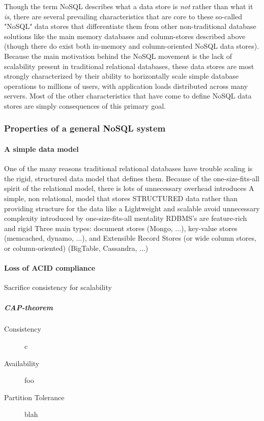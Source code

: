 \documentclass[11pt,a4paper]{report}
\begin{document}
Though the term NoSQL describes what a data store is \textit{not} rather than what it \textit{is}, there are several prevailing characteristics that are core to these so-called "NoSQL" data stores that differentiate them from other non-traditional database solutions like the main memory databases and column-stores described above (though there do exist both in-memory and column-oriented NoSQL data stores). Because the main motivation behind the NoSQL movement is the lack of scalability present in traditional relational databases, these data stores are most strongly characterized by their ability to horizontally scale simple database operations to millions of users, with application loads distributed across many servers.\cite{strauch2011nosql} Most of the other characteristics that have come to define NoSQL data stores are simply consequences of this primary goal.

\subsubsection{Properties of a  general NoSQL system}

\paragraph{A simple data model}
One of the many reasons traditional relational databases have trouble scaling is the rigid, structured data model that defines them. Because of the one-size-fits-all spirit of the relational model, there is lots of unnecessary overhead  introduces A simple, non relational, model that stores STRUCTURED data rather than providing structure for the data like a 
Lightweight and scalable
avoid unnecessary complexity introduced by one-size-fits-all mentality
RDBMS's are feature-rich and rigid
Three main types: document stores (Mongo, ...), key-value stores (memcached, dynamo, ...), and Extensible Record Stores (or wide column stores, or column-oriented) (BigTable, Cassandra, ...)

\paragraph{Loss of ACID compliance}
Sacrifice consistency for scalability
\subparagraph{CAP-theorem}
\begin{description}
\item[Consistency] c
\item[Availability] foo
\item[Partition Tolerance] blah
\end{description}
\end{document}
